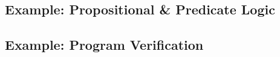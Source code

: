 
\subsection{Example: Propositional \& Predicate Logic}


\subsection{Example: Program Verification}


